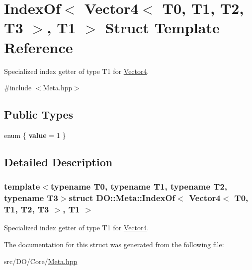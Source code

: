 \hypertarget{struct_d_o_1_1_meta_1_1_index_of_3_01_vector4_3_01_t0_00_01_t1_00_01_t2_00_01_t3_01_4_00_01_t1_01_4}{\section{Index\-Of$<$ Vector4$<$ T0, T1, T2, T3 $>$, T1 $>$ Struct Template Reference}
\label{struct_d_o_1_1_meta_1_1_index_of_3_01_vector4_3_01_t0_00_01_t1_00_01_t2_00_01_t3_01_4_00_01_t1_01_4}
}


Specialized index getter of type T1 for \hyperlink{struct_d_o_1_1_meta_1_1_vector4}{Vector4}.  




{\ttfamily \#include $<$Meta.\-hpp$>$}

\subsection*{Public Types}
\begin{DoxyCompactItemize}
\item 
enum \{ {\bfseries value} = 1
 \}
\end{DoxyCompactItemize}


\subsection{Detailed Description}
\subsubsection*{template$<$typename T0, typename T1, typename T2, typename T3$>$struct D\-O\-::\-Meta\-::\-Index\-Of$<$ Vector4$<$ T0, T1, T2, T3 $>$, T1 $>$}

Specialized index getter of type T1 for \hyperlink{struct_d_o_1_1_meta_1_1_vector4}{Vector4}. 

The documentation for this struct was generated from the following file\-:\begin{DoxyCompactItemize}
\item 
src/\-D\-O/\-Core/\hyperlink{_meta_8hpp}{Meta.\-hpp}\end{DoxyCompactItemize}
